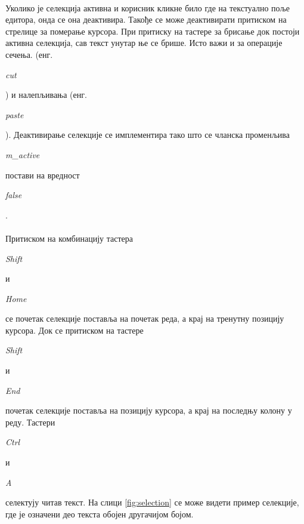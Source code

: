 \documentclass[12pt,oneside]{memoir}
\begin{document}
\paragraph{}
Уколико је селекција активна и корисник кликне било где на текстуално поље едитора,
онда се она деактивира. Такође се може деактивирати притиском на стрелице за померање
курсора. При притиску на тастере за брисање док постоји активна селекција, сав текст
унутар ње се брише. Исто важи и за операције сечења.
(енг. \begin{latinica}\textit{cut}\end{latinica}) и налепљивања
(енг. \begin{latinica}\textit{paste}\end{latinica}). Деактивирање селекције
се имплементира тако што се чланска променљива 
\begin{latinica}\textit{m\_active}\end{latinica} постави на вредност
\begin{latinica}\textit{false}\end{latinica}.

\paragraph{}
Притиском на комбинацију тастера \begin{latinica}\textit{Shift}\end{latinica} и
\begin{latinica}\textit{Home}\end{latinica} се почетак селекције поставља на почетак реда,
а крај на тренутну позицију курсора. Док се притиском на тастере 
\begin{latinica}\textit{Shift}\end{latinica} и \begin{latinica}\textit{End}\end{latinica}
почетак селекције поставља на позицију курсора, а крај на последњу колону у реду.
Тастери \begin{latinica}\textit{Ctrl}\end{latinica} и
\begin{latinica}\textit{A}\end{latinica} селектују читав текст. На слици 
\ref{fig:selection} се може видети пример селекције, где је означени део текста
обојен другачијом бојом.
\end{document}
